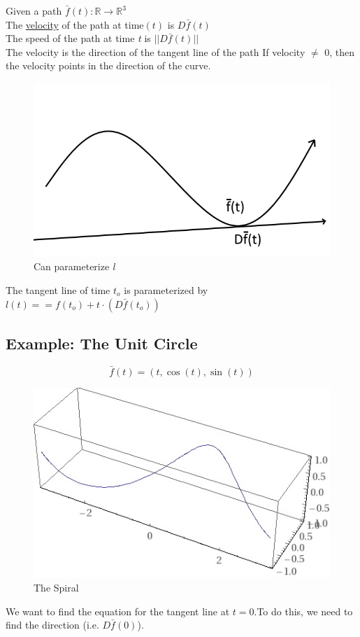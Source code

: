 \documentclass{article}
\begin{document}
Given a path $\bar{f}(t):\mathbb{R}\rightarrow\mathbb{R}^3$\\[6pt]
The \underline{velocity} of the path at time$(t)$ is $D\bar{f}(t)$\\[6pt]
The speed of the path at time \textit{t} is $||D\bar{f}(t)||$\\[6pt]
The velocity is the direction of the tangent line of the path
If velocity $\neq$ 0, then the velocity points in the direction of the curve.
\begin{figure}[h!]
    \centering
    \includegraphics[scale =.5]{line.png}
    \caption{Can parameterize \textit{l}}
    \label{}
\end{figure}
The tangent line of time $t_o$ is parameterized by $l(t)==f(t_o)+t\cdot(D\bar{f}(t_o))$
\newpage
\subsection*{Example: The Unit Circle}
\[\bar{f}(t)=(t,\cos(t),\sin(t))\]
\begin{figure}[h!]
    \centering
    \includegraphics[scale=.5]{spiral.jpg}
    \caption{The Spiral}
    \label{}
\end{figure}
\newpage
We want to find the equation for the tangent line at $t=0$.To do this, we need to find the direction (i.e. $D\bar{f}(0)$).
\end{document}
